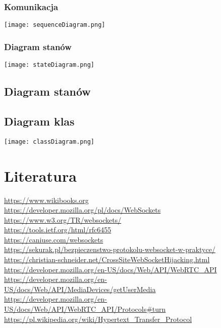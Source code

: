 \documentclass{article}
\begin{document}
\subsubsection{Komunikacja}
\texttt{[image: sequenceDiagram.png]}

\subsubsection{Diagram stanów}
\texttt{[image: stateDiagram.png]}

\subsection{Diagram stanów}

\subsection{Diagram klas}
\texttt{[image: classDiagram.png]}

\section{Literatura}

\url{https://www.wikibooks.org}\\
\url{https://developer.mozilla.org/pl/docs/WebSockets}\\
\url{https://www.w3.org/TR/websockets/}\\
\url{https://tools.ietf.org/html/rfc6455}\\
\url{https://caniuse.com/websockets}\\
\url{https://sekurak.pl/bezpieczenstwo-protokolu-websocket-w-praktyce/}\\
\url{https://christian-schneider.net/CrossSiteWebSocketHijacking.html}\\
\url{https://developer.mozilla.org/en-US/docs/Web/API/WebRTC_API}\\
\url{https://developer.mozilla.org/en-US/docs/Web/API/MediaDevices/getUserMedia}\\
\url{https://developer.mozilla.org/en-US/docs/Web/API/WebRTC_API/Protocols#turn}\\
\url{https://pl.wikipedia.org/wiki/Hypertext_Transfer_Protocol}
\end{document}
